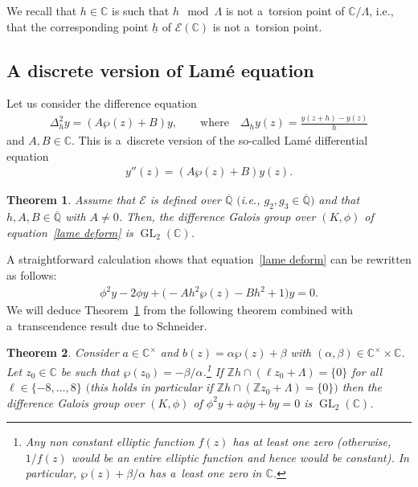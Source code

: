 \documentclass[pdftex]{sigma}
\numberwithin{equation}{section}
\newtheorem{Theorem}{Theorem}[section]
\begin{document}
We recall that $h \in \mathbb C$ is such that $h \mod \Lambda$ is not a~torsion point of $\mathbb C/\Lambda$, i.e.,
that the corresponding point $\underline{h}$ of $\mathcal{E}(\mathbb C)$ is not a~torsion point.

\subsection{A discrete version of Lam\'e equation}
\label{sec61}
Let us consider the dif\/ference equation
\begin{gather}
\label{lame deform}
\Delta_h^2 y = (A\wp(z)+B)y, \qquad  \text{where} \quad \Delta_h y(z)= \frac{y(z+h)-y(z)}{h}
\end{gather}
and $A,B \in \mathbb C$.
This is a~discrete version of the so-called Lam\'e dif\/ferential equation
\begin{gather*}
y''(z) = (A\wp(z)+B)y(z).
\end{gather*}

\begin{Theorem}
\label{theo lame alg}
Assume that $\mathcal{E}$ is defined over $\overline{\mathbb{Q}}$ $($i.e., $g_{2},g_{3} \in \overline{\mathbb{Q}})$
and that $h,A,B\in \overline{\mathbb{Q}}$ with $A \neq 0$.
Then, the difference Galois group over $(K,\phi)$ of equation~\eqref{lame deform} is $\operatorname{GL}_{2}(\mathbb C)$.
\end{Theorem}

A straightforward calculation shows that equation~\eqref{lame deform} can be rewritten as follows:
\begin{gather*}
\phi^2 y -2\phi y+\big({-}Ah^2\wp(z)-Bh^2+1\big)y=0.
\end{gather*}
We will deduce Theorem~\ref{theo lame alg} from the following theorem combined with a~transcendence result due to
Schneider.

\begin{Theorem}
\label{theo3}
Consider $a\in \mathbb C^{\times}$ and $b(z)=\alpha \wp(z) + \beta$ with $(\alpha,\beta) \in \mathbb C^{\times} \times
\mathbb C$.
Let $z_0 \in \mathbb C$ be such that $\wp(z_0)=-\beta/\alpha$.\footnote{Any non constant elliptic function $f(z)$ has at
least one zero (otherwise, $1/f(z)$ would be an entire elliptic function and hence would be constant).
In particular, $\wp(z)+\beta/\alpha$ has a~least one zero in $\mathbb C$.}
If $\mathbb Z h \cap (\ell z_{0} + \Lambda)=\{0\}$ for all $\ell \in \{-8,\dots,8\}$ $($this holds in particular if
$\mathbb Z h \cap (\mathbb Z z_{0} + \Lambda)=\{0\})$ then the difference Galois group over $(K,\phi)$ of $\phi^2 y
+a\phi y+by=0$ is $\operatorname{GL}_{2}(\mathbb C)$.
\end{Theorem}
\end{document}
